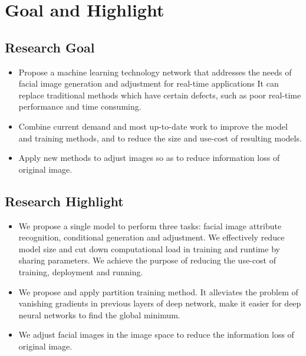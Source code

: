 \section{Goal and Highlight}

\subsection{Research Goal}
\begin{itemize}
\item
Propose a machine learning technology network that addresses the needs of facial image generation and adjustment for real-time applications
It can replace traditional methods which have certain defects, such as poor real-time performance and time consuming.
\item
Combine current demand and most up-to-date work to improve the model and training methods,
    and to reduce the size and use-cost of resulting models.
\item
Apply new methods to adjust images so as to reduce information loss of original image.
\end{itemize}
\subsection{Research Highlight}
\begin{itemize}
\item
We propose a single model to perform three tasks: facial image attribute recognition,
    conditional generation and adjustment.
We effectively reduce model size and cut down computational load in training and runtime by sharing parameters.
We achieve the purpose of reducing the use-cost of training, deployment and running.
\item
We propose and apply partition training method.
It alleviates the problem of vanishing gradients in previous layers of deep network,
    make it easier for deep neural networks to find the global minimum.

\item
We adjust facial images in the image space to reduce the information loss of original image.
\end{itemize}